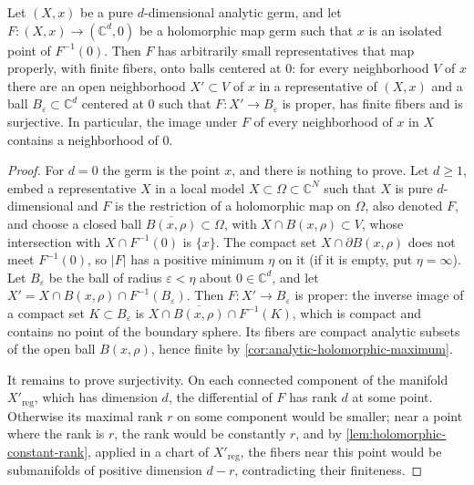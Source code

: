 \begin{lemma}\label{lem:finite-analytic-open-map}
Let $(X,x)$ be a pure $d$-dimensional analytic germ, and let $F\colon(X,x)\to(\mathbb C^d,0)$ be a holomorphic map germ such that $x$ is an isolated point of $F^{-1}(0)$. Then $F$ has arbitrarily small representatives that map properly, with finite fibers, onto balls centered at $0$: for every neighborhood $V$ of $x$ there are an open neighborhood $X'\subset V$ of $x$ in a representative of $(X,x)$ and a ball $B_\varepsilon\subset\mathbb C^d$ centered at $0$ such that $F\colon X'\to B_\varepsilon$ is proper, has finite fibers and is surjective. In particular, the image under $F$ of every neighborhood of $x$ in $X$ contains a neighborhood of $0$.
\end{lemma}
\begin{proof}
For $d=0$ the germ is the point $x$, and there is nothing to prove. Let $d\geq1$, embed a representative $X$ in a local model $X\subset\Omega\subset\mathbb C^N$ such that $X$ is pure $d$-dimensional and $F$ is the restriction of a holomorphic map on $\Omega$, also denoted $F$, and choose a closed ball $\overline{B(x,\rho)}\subset\Omega$, with $X\cap B(x,\rho)\subset V$, whose intersection with $X\cap F^{-1}(0)$ is $\{x\}$. The compact set $X\cap\partial B(x,\rho)$ does not meet $F^{-1}(0)$, so $|F|$ has a positive minimum $\eta$ on it (if it is empty, put $\eta=\infty$). Let $B_\varepsilon$ be the ball of radius $\varepsilon<\eta$ about $0\in\mathbb C^d$, and let $X'=X\cap B(x,\rho)\cap F^{-1}(B_\varepsilon)$. Then $F\colon X'\to B_\varepsilon$ is proper: the inverse image of a compact set $K\subset B_\varepsilon$ is $X\cap\overline{B(x,\rho)}\cap F^{-1}(K)$, which is compact and contains no point of the boundary sphere. Its fibers are compact analytic subsets of the open ball $B(x,\rho)$, hence finite by \cref{cor:analytic-holomorphic-maximum}.

It remains to prove surjectivity. On each connected component of the manifold $X'_{\mathrm{reg}}$, which has dimension $d$, the differential of $F$ has rank $d$ at some point. Otherwise its maximal rank $r$ on some component would be smaller; near a point where the rank is $r$, the rank would be constantly $r$, and by \cref{lem:holomorphic-constant-rank}, applied in a chart of $X'_{\mathrm{reg}}$, the fibers near this point would be submanifolds of positive dimension $d-r$, contradicting their finiteness.


\end{proof}
